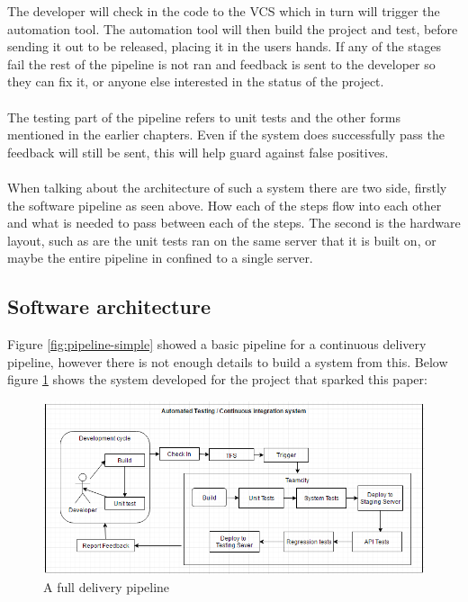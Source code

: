 The developer will check in the code to the VCS which in turn will trigger the automation tool. The automation tool will then build the project and test, before sending it out to be released, placing it in the users hands. If any of the stages fail the rest of the pipeline is not ran and feedback is sent to the developer so they can fix it, or anyone else interested in the status of the project. 
\\\\
The testing part of the pipeline refers to unit tests and the other forms mentioned in the earlier chapters. Even if the system does successfully pass the feedback will still be sent, this will help guard against false positives.
\\\\
When talking about the architecture of such a system there are two side, firstly the software pipeline as seen above. How each of the steps flow into each other and what is needed to pass between each of the steps. The second is the hardware layout,  such as are the unit tests ran on the same server that it is built on, or maybe the entire pipeline in confined to a single server.

\subsection{Software architecture}
\label{sec:testing}

Figure \ref{fig:pipeline-simple} showed a basic pipeline for a continuous delivery pipeline, however there is not enough details to build a system from this. Below figure \ref{fig:bsipipeline} shows the system developed for the project that sparked this paper:

\begin{figure}[H]
	\centering
	\includegraphics[scale=0.6]{images/bsipipleine.png}
	\caption{A full delivery pipeline}
	\label{fig:bsipipeline}
\end{figure}

